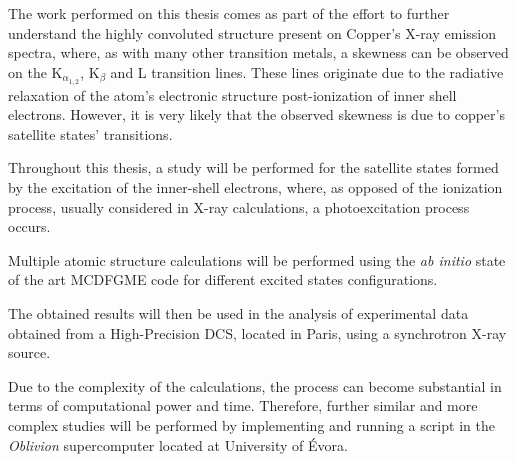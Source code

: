 

%

The work performed on this thesis comes as part of the effort to further understand the highly convoluted structure present on Copper's X-ray emission spectra, where, as with many other transition metals, a skewness can be observed on the K$_{\alpha_{1,2}}$, K$_{\beta}$ and L transition lines. These lines originate due to the radiative relaxation of the atom's electronic structure post-ionization of inner shell electrons.
However, it is very likely that the observed skewness is due to copper's satellite states' transitions.

Throughout this thesis, a study will be performed for the satellite states formed by the excitation of the inner-shell electrons, where, as opposed of the ionization process, usually considered in X-ray calculations, a photoexcitation process occurs.

 Multiple atomic structure calculations will be performed using the \textit{ab initio} state of the art \gls{MCDFGME} code for different excited states configurations.

 The obtained results will then be used in the analysis of experimental data obtained from a High-Precision \gls{DCS}, located in Paris, using a synchrotron X-ray source.

Due to the complexity of the calculations, the process can become substantial in terms of computational power and time. Therefore, further similar and more complex studies will be performed by implementing and running a script in the \textit{Oblivion} supercomputer located at University of Évora.

